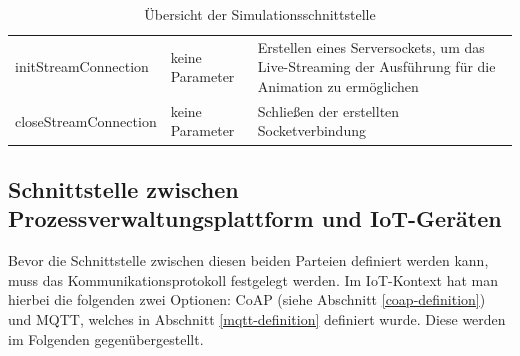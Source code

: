 \begin{table}[H]
\begin{tabularx}{\textwidth}{l >{\hsize=0.65\hsize\raggedright\arraybackslash}X >{\hsize=1.35\hsize\raggedright\arraybackslash}X}
initStreamConnection        &   keine Parameter                                                     & Erstellen eines Serversockets, um das Live-Streaming der Ausführung für die Animation zu ermöglichen\\
closeStreamConnection       &   keine Parameter                                                     & Schließen der erstellten Socketverbindung \\
\bottomrule
\end{tabularx}
\normalsize
\renewcommand{\arraystretch}{1}
\caption{Übersicht der Simulationsschnittstelle}
\label{tab:simulation-interface}
\end{table}

\newpage

\subsection{Schnittstelle zwischen Prozessverwaltungsplattform und IoT-Geräten}

Bevor die Schnittstelle zwischen diesen beiden Parteien definiert werden kann, muss das Kommunikationsprotokoll festgelegt werden. Im IoT-Kontext hat man hierbei die 
folgenden zwei Optionen: CoAP (siehe Abschnitt \ref{coap-definition}) und MQTT, welches in Abschnitt \ref{mqtt-definition} definiert wurde. \cite{wendzel_it-sicherheit_2018} Diese werden im Folgenden gegenübergestellt.

